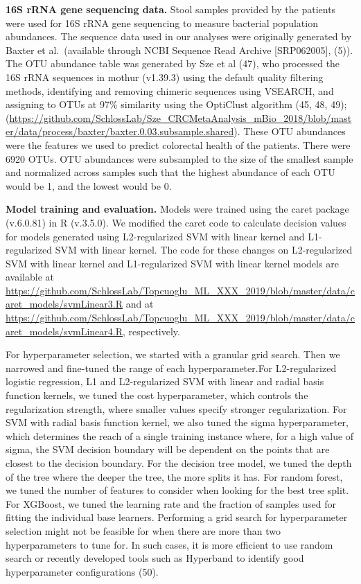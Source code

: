 \documentclass[
  11pt,
]{article}
\begin{document}
\textbf{16S rRNA gene sequencing data.} Stool samples provided by the
patients were used for 16S rRNA gene sequencing to measure bacterial
population abundances. The sequence data used in our analyses were
originally generated by Baxter et al.~(available through NCBI Sequence
Read Archive {[}SRP062005{]}, (5)). The OTU abundance table was
generated by Sze et al (47), who processed the 16S rRNA sequences in
mothur (v1.39.3) using the default quality filtering methods,
identifying and removing chimeric sequences using VSEARCH, and assigning
to OTUs at 97\% similarity using the OptiClust algorithm (45, 48, 49);
(\url{https://github.com/SchlossLab/Sze_CRCMetaAnalysis_mBio_2018/blob/master/data/process/baxter/baxter.0.03.subsample.shared}).
These OTU abundances were the features we used to predict colorectal
health of the patients. There were 6920 OTUs. OTU abundances were
subsampled to the size of the smallest sample and normalized across
samples such that the highest abundance of each OTU would be 1, and the
lowest would be 0.

\textbf{Model training and evaluation.} Models were trained using the
caret package (v.6.0.81) in R (v.3.5.0). We modified the caret code to
calculate decision values for models generated using L2-regularized SVM
with linear kernel and L1-regularized SVM with linear kernel. The code
for these changes on L2-regularized SVM with linear kernel and
L1-regularized SVM with linear kernel models are available at
\url{https://github.com/SchlossLab/Topcuoglu_ML_XXX_2019/blob/master/data/caret_models/svmLinear3.R}
and at
\url{https://github.com/SchlossLab/Topcuoglu_ML_XXX_2019/blob/master/data/caret_models/svmLinear4.R},
respectively.

For hyperparameter selection, we started with a granular grid search.
Then we narrowed and fine-tuned the range of each hyperparameter.For
L2-regularized logistic regression, L1 and L2-regularized SVM with
linear and radial basis function kernels, we tuned the cost
hyperparameter, which controls the regularization strength, where
smaller values specify stronger regularization. For SVM with radial
basis function kernel, we also tuned the sigma hyperparameter, which
determines the reach of a single training instance where, for a high
value of sigma, the SVM decision boundary will be dependent on the
points that are closest to the decision boundary. For the decision tree
model, we tuned the depth of the tree where the deeper the tree, the
more splits it has. For random forest, we tuned the number of features
to consider when looking for the best tree split. For XGBoost, we tuned
the learning rate and the fraction of samples used for fitting the
individual base learners. Performing a grid search for hyperparameter
selection might not be feasible for when there are more than two
hyperparameters to tune for. In such cases, it is more efficient to use
random search or recently developed tools such as Hyperband to identify
good hyperparameter configurations (50).
\end{document}
